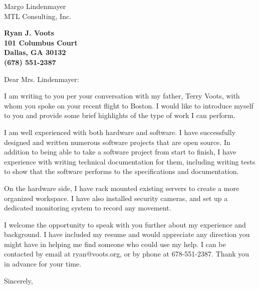 \documentclass[11pt]{letter} %
\begin{document}
\signature{Ryan Voots}                  %
\longindentation=0pt                       %
\let\raggedleft\raggedright                %
 
\begin{letter}{
Margo Lindenmayer \\
MTL Consulting, Inc.}

\begin{center}
\large\bf Ryan J. Voots \\
101 Columbus Court \\ Dallas, GA 30132 \\ (678) 551-2387
\end{center} 
\vspace{1in}

\opening{Dear Mrs. Lindenmayer:}

I am writing to you per your conversation with my father, Terry Voots, with whom you spoke on your recent flight to Boston.  I would like to introduce myself to you and provide some brief highlights of the type of work I can perform.

I am well experienced with both hardware and software.  I have successfully designed and written numerous software projects that are open source.  In addition to being able to take a software project from start to finish, I have experience with writing technical documentation for them, including writing tests to show that the software performs to the specifications and documentation.

On the hardware side, I have rack mounted existing servers to create a more organized workspace.  I have also installed security cameras, and set up a dedicated monitoring system to record any movement.

I welcome the opportunity to speak with you further about my experience and background.  I have included my resume and would appreciate any direction you might have in helping me find someone who could use my help.  I can be contacted by email at ryan@voots.org, or by phone at 678-551-2387.  Thank you in advance for your time.  

\closing{Sincerely,}

\end{letter}
 
\end{document}
